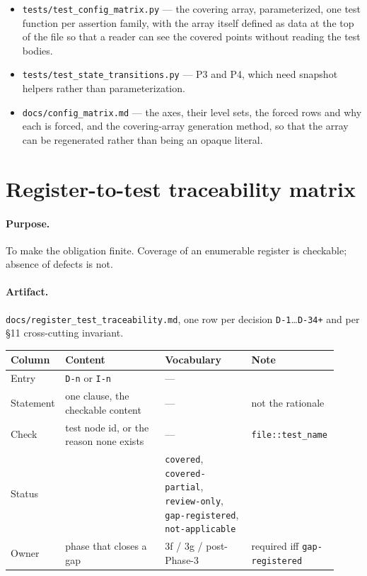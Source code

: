 \documentclass[11pt]{article}
\renewcommand{\tt}[1]{\texttt{#1}}
\begin{document}
\begin{itemize}
  \item \tt{tests/test\allowbreak{}\_config\allowbreak{}\_matrix.py} --- the covering array, parameterized, one
  test function per assertion family, with the array itself defined as data at the top of
  the file so that a reader can see the covered points without reading the test bodies.
  \item \tt{tests/test\allowbreak{}\_state\allowbreak{}\_transitions.py} --- P3 and P4, which need
  snapshot helpers rather than parameterization.
  \item \tt{docs/config\allowbreak{}\_matrix.md} --- the axes, their level sets, the forced rows and
  why each is forced, and the covering-array generation method, so that the array can be
  regenerated rather than being an opaque literal.
\end{itemize}

\section{Register-to-test traceability matrix}

\paragraph{Purpose.} To make the obligation finite. Coverage of an enumerable register is
checkable; absence of defects is not.

\paragraph{Artifact.} \tt{docs/register\allowbreak{}\_test\allowbreak{}\_traceability.md}, one row per decision
\tt{D-1}\dots\tt{D-34+} and per \S11 cross-cutting invariant.

\begin{longtable}{@{}
  >{\raggedright\arraybackslash}p{0.10\linewidth}
  >{\raggedright\arraybackslash}p{0.30\linewidth}
  >{\raggedright\arraybackslash}p{0.26\linewidth}
  >{\raggedright\arraybackslash}p{0.26\linewidth}@{}}
\toprule
Column & Content & Vocabulary & Note \\
\midrule
\endhead
Entry & \tt{D-n} or \tt{I-n} & --- & \\
Statement & one clause, the checkable content & --- & not the rationale \\
Check & test node id, or the reason none exists & --- & \tt{file::test\_name} \\
Status & & \tt{covered}, \tt{covered-partial}, \tt{review-only}, \tt{gap-registered},
\tt{not-applicable} & \\
Owner & phase that closes a gap & 3f / 3g / post-Phase-3 & required iff
\tt{gap-registered} \\
\bottomrule
\end{longtable}
\end{document}

